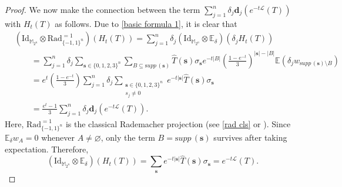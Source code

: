 \documentclass{amsbook}
\theoremstyle{definition}
\theoremstyle{remark}
\numberwithin{section}{chapter}
\numberwithin{equation}{chapter}
\newcommand{\M}{\mathbb{M}}
\newcommand{\1}{\mathbf{1}}
\newcommand{\s}{\mathbf{s}}
\newcommand{\dc}{\mathbf{d}}
\newcommand{\supp}{{\mathrm supp}\,}
\begin{document}
\begin{proof}
We now make the connection between the term $\sum_{j=1}^{n}\delta_{j}\dc_{j}\left(e^{-t\mathcal{L}}(T)\right)$ with $H_{t}(T)$ as follows.
Due to \eqref{basic formula 1}, it is clear that
\begin{equation}\label{basic formula 3}
\begin{aligned}
&\left(\mathrm{Id}_{\M_{2^{n}}}\otimes \mathrm{Rad}^{=1}_{\{-1,1\}^{n}}\right)(H_{t}(T))=\sum_{j=1}^{n}\delta_{j}\left(\mathrm{Id}_{\M_{2^{n}}}\otimes \mathbb{E}_{\delta}\right)\left(\delta_{j}H_{t}(T)\right)\\
&\qquad=\sum_{j=1}^{n}\delta_{j}\sum_{\s\in\{0,1,2,3\}^{n}}\sum_{B\subseteq\supp(\s)}\widehat{T}(\s)\sigma_{\s}e^{-t|B|}(\frac{1-e^{-t}}3)^{|\s|-|B|}\mathbb{E}(\delta_{j}w_{\supp(\s)\setminus B})\\
&\qquad=e^{t}(\frac{1-e^{-t}}3)\sum_{j=1}^{n}\delta_{j}\sum_{\substack{\s\in\{0,1,2,3\}^{n}\\s_{j}\neq 0}}e^{-t|\s|}\widehat{T}(\s)\sigma_{\s}\\
&\qquad=\frac{e^{t}-1}3\sum_{j=1}^{n}\delta_{j}\dc_{j}\left(e^{-t\mathcal{L}}(T)\right).
\end{aligned}
\end{equation}
Here, $\mathrm{Rad}^{=1}_{\{-1,1\}^{n}}$ is the classical Rademacher projection (see \eqref{rad cls} or \cite{Pi1982}). 
Since $\mathbb E_{\delta} w_A=0$ whenever $A\neq\varnothing$,
	only the term $B=\supp(\s)$ survives after taking expectation.
	Therefore,
	\begin{equation}\label{mean-of-modified-H}
		\left(
		\mathrm{Id}_{\mathbb M_{2^n}}\otimes\mathbb E_\delta
		\right)(H_t(T))
		=
		\sum_{\s}
		e^{-t|\s|}
		\widehat T(\s)\sigma_{\s}
		=
		e^{-t\mathcal L}(T).
	\end{equation}


\end{proof}
\end{document}
